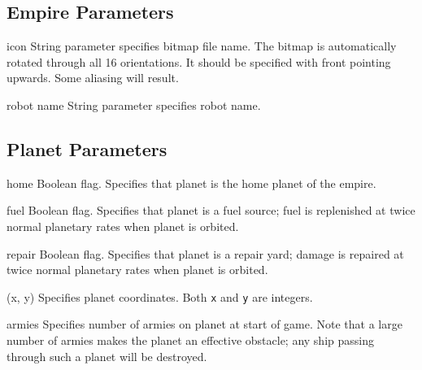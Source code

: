 \subsection{Empire Parameters}
\begin{list}{}{
	\renewcommand{\makelabel}[1]{{\tt #1 \hfill}}
         \setlength{\leftmargin}{2.5cm}
         \setlength{\labelwidth}{\leftmargin}
         \setlength{\labelsep}{0in}
         \setlength{\itemsep}{.2em}
}

\item[icon] String parameter specifies bitmap file name.   The bitmap is
            automatically rotated through all 16 orientations.  It 
            should be specified with front pointing upwards.   Some aliasing 
            will result.  

\item[robot name]  String parameter specifies robot name.  
\end{list}

\subsection{Planet Parameters}
\begin{list}{}{
	\renewcommand{\makelabel}[1]{{\tt #1 \hfill}}
         \setlength{\leftmargin}{2.5cm}
         \setlength{\labelwidth}{\leftmargin}
         \setlength{\labelsep}{0in}
}
\item[home]  Boolean flag.  Specifies that planet is the home planet of the
empire.
\item[fuel] Boolean flag.  Specifies that planet is a fuel source; fuel is
replenished at twice normal planetary rates when planet is orbited. 
\item[repair] Boolean flag.  Specifies that planet is a repair yard; damage is
repaired at twice normal planetary rates when planet is orbited. 
\item[(x,  y)]  Specifies planet coordinates. Both {\tt x} and {\tt y} are
integers.
\item[armies] Specifies number of armies on planet at start of game.
Note that a large number of  armies makes the planet an effective obstacle;
any ship passing through such a planet will be destroyed.
\end{list}

